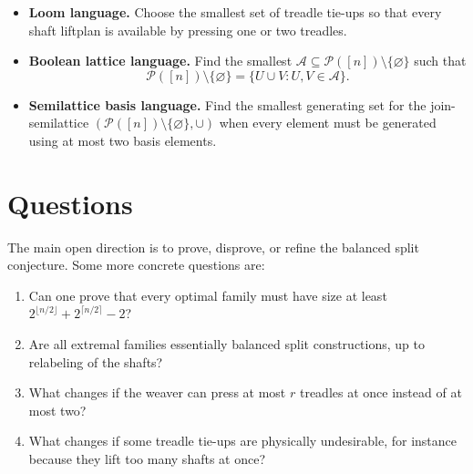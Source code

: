 \documentclass[11pt]{article}
\newcommand{\pow}{\mathcal{P}}
\newcommand{\A}{\mathcal{A}}
\begin{document}
\begin{itemize}[leftmargin=2em]
  \item \textbf{Loom language.} Choose the smallest set of treadle tie-ups so
  that every shaft liftplan is available by pressing one or two treadles.

  \item \textbf{Boolean lattice language.} Find the smallest
  \(\A\subseteq\pow([n])\setminus\{\varnothing\}\) such that
  \[
    \pow([n])\setminus\{\varnothing\}
    =
    \{U\cup V : U,V\in\A\}.
  \]

  \item \textbf{Semilattice basis language.} Find the smallest generating set
  for the join-semilattice \((\pow([n])\setminus\{\varnothing\},\cup)\) when
  every element must be generated using at most two basis elements.
\end{itemize}

\section{Questions}

The main open direction is to prove, disprove, or refine the balanced split
conjecture. Some more concrete questions are:

\begin{enumerate}[leftmargin=2em]
  \item Can one prove that every optimal family must have size at least
  \(2^{\lfloor n/2\rfloor}+2^{\lceil n/2\rceil}-2\)?

  \item Are all extremal families essentially balanced split constructions, up
  to relabeling of the shafts?

  \item What changes if the weaver can press at most \(r\) treadles at once
  instead of at most two?

  \item What changes if some treadle tie-ups are physically undesirable, for
  instance because they lift too many shafts at once?
\end{enumerate}
\end{document}
